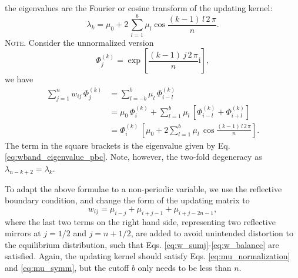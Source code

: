 \documentclass[reprint, superscriptaddress, floatfix]{revtex4-1}
\newcommand{\note}[1]{{\color{DarkGreen}\footnotesize \textsc{Note.} #1}}
\newcommand{\ii}{\mathrm{i}}
\begin{document}
the eigenvalues are
the Fourier or cosine transform of the updating kernel:
%
\begin{equation}
  \lambda_k
  =
  \mu_0
  +
  2 \,
  \sum_{ l = 1 }^b
  \mu_l
  \cos
  \frac{ (k - 1) \, l \, 2 \, \pi }
       {            n             }
  .
  \label{eq:wband_eigenvalue_pbc}
\end{equation}
%
\note{Consider the unnormalized version
  $$
  \Phi^{(k)}_j =
  \exp\left[
    \frac{ ( k - 1 ) \, j \, 2 \, \pi }
         {              n             }
    \ii
  \right]
  ,
  $$
  we have
  $$
  \begin{aligned}
  \sum_{j = 1}^n
    w_{ij} \, \Phi^{(k)}_j
  &=
  \sum_{l = -b}^b
    \mu_l \, \Phi^{(k)}_{i - l}
  \\
  &=
  \mu_0 \, \Phi^{(k)}_i
  +
  \sum_{l = 1}^b
    \mu_l \,
    \left[ \Phi^{(k)}_{i - l} + \Phi^{(k)}_{i + l} \right]
  \\
  &=
  \Phi^{(k)}_i \,
  \left[
    \mu_0
    +
    2 \sum_{l = 1}^b
      \mu_l \, \cos
      \frac{ (k - 1) \, l \, 2 \, \pi }
           {            n             }
  \right]
  .
  \end{aligned}
  $$
  The term in the square brackets is the eigenvalue given by
  Eq. \eqref{eq:wband_eigenvalue_pbc}.
}
%
Note, however, the two-fold degeneracy as
$\lambda_{n - k + 2} = \lambda_k$.



To adapt the above formulae to a non-periodic variable,
we use the reflective boundary condition\cite{bussi2006},
and change the form of the updating matrix to
%
%
\begin{equation}
  w_{ij}
  =
  \mu_{ i - j }
  +
  \mu_{ i + j - 1 }
  +
  \mu_{ i + j - 2 n - 1 }
  ,
  \label{eq:w_band_refl}
\end{equation}
%
where the last two terms on the right hand side,
representing two reflective mirrors at
$j = 1/2$ and $j = n + 1/2$,
are added to avoid unintended distortion\cite{dickson2011, mcgovern2013}
to the equilibrium distribution\cite{bussi2006},
such that Eqs. \eqref{eq:w_sumj}-\eqref{eq:w_balance}
are satisfied.
%
Again, the updating kernel should satisfy
Eqs. \eqref{eq:mu_normalization}
and \eqref{eq:mu_symm},
but
the cutoff $b$ only needs to be less than $n$.
\end{document}
